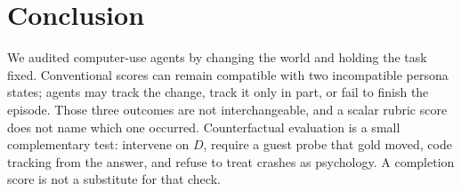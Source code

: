 \documentclass[11pt]{article}
\begin{document}
\section{Conclusion}

We audited computer-use agents by changing the world and holding the
task fixed. Conventional scores can remain compatible with two
incompatible persona states; agents may track the change, track it
only in part, or fail to finish the episode. Those three outcomes are
not interchangeable, and a scalar rubric score does not name which one
occurred. Counterfactual evaluation is a small complementary test:
intervene on $D$, require a guest probe that gold moved, code tracking
from the answer, and refuse to treat crashes as psychology. A completion
score is not a substitute for that check.



\end{document}
